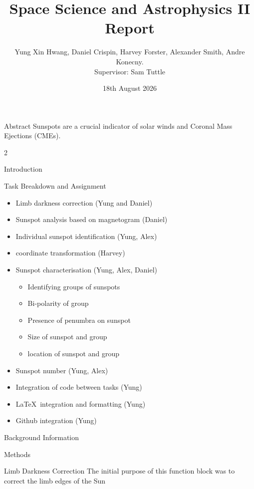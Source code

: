 \documentclass[a4paper]{article}
\title{Space Science and Astrophysics II Report}
\author{Yung Xin Hwang, Daniel Crispin, Harvey Forster, Alexander Smith, Andre Konecny. \\ Supervisor: Sam Tuttle}
\date{18th August 2026}
\begin{document}
\begin{section}{Abstract}
        Sunspots are a crucial indicator of solar winds and Coronal Mass Ejections (CMEs).
\end{section}
\begin{multicols}{2}
    
    \begin{section}{Introduction}
        
    \end{section}
    
    \begin{section}{Task Breakdown and Assignment}
        \begin{itemize}
            \item Limb darkness correction (Yung and Daniel)
            \item Sunspot analysis based on magnetogram (Daniel)
            \item Individual sunspot identification (Yung, Alex)
            \item coordinate transformation (Harvey)
            \item Sunspot characterisation (Yung, Alex, Daniel)
            \begin{itemize}
                \item Identifying groups of sunspots
                \item Bi-polarity of group
                \item Presence of penumbra on sunspot
                \item Size of sunspot and group
                \item location of sunspot and group
            \end{itemize}
            \item Sunspot number (Yung, Alex)
            \item Integration of code between tasks (Yung)
            \item \LaTeX\  integration and formatting (Yung)
            \item Github integration (Yung)
        \end{itemize}
    \end{section}
    
    \begin{section}{Background Information}
        
    \end{section}
    
    \begin{section}{Methods}
        \begin{subsection}{Limb Darkness Correction}
            The initial purpose of this function block was to correct the limb edges of the Sun
        \end{subsection}
    \end{section}
    

\end{multicols}
\end{document}
